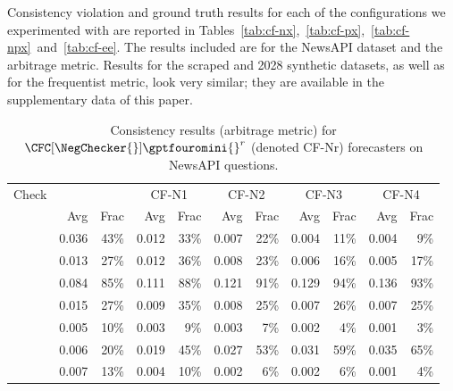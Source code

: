 \label{cfc/app:cf-results}

Consistency violation and ground truth results for each of the \CFCaster{} configurations we experimented with are reported in Tables~\ref{tab:cf-nx},~\ref{tab:cf-px},~\ref{tab:cf-npx}~and~\ref{tab:cf-ee}. The results included are for the NewsAPI dataset and the arbitrage metric.
Results for the scraped and 2028 synthetic datasets, as well as for the
frequentist metric, look very similar; they are available in the supplementary data of this paper.

{
\setlength{\tabcolsep}{0.46em}
\begin{table}[htbp]
\caption{Consistency results (arbitrage metric) for $\CFC[\NegChecker{}]{\gptfouromini{}}^r$ (denoted CF-Nr) forecasters on NewsAPI questions.}
\begin{tabular}{lrrrrrrrrrr}
\toprule
Check & \multicolumn{2}{c}{\gptfouromini{}} & \multicolumn{2}{c}{CF-N1} & \multicolumn{2}{c}{CF-N2} & \multicolumn{2}{c}{CF-N3} & \multicolumn{2}{c}{CF-N4} \\
 & Avg & Frac & Avg & Frac & Avg & Frac & Avg & Frac & Avg & Frac \\
\midrule
\NegChecker{} & 0.036 & 43\% & 0.012 & 33\% & 0.007 & 22\% & 0.004 & 11\% & 0.004 & 9\% \\
\ParaphraseChecker{} & 0.013 & 27\% & 0.012 & 36\% & 0.008 & 23\% & 0.006 & 16\% & 0.005 & 17\% \\
\CondCondChecker{} & 0.084 & 85\% & 0.111 & 88\% & 0.121 & 91\% & 0.129 & 94\% & 0.136 & 93\% \\
\ExpectedEvidenceChecker{} & 0.015 & 27\% & 0.009 & 35\% & 0.008 & 25\% & 0.007 & 26\% & 0.007 & 25\% \\
\ConsequenceChecker{} & 0.005 & 10\% & 0.003 & 9\% & 0.003 & 7\% & 0.002 & 4\% & 0.001 & 3\% \\
\AndChecker{} & 0.006 & 20\% & 0.019 & 45\% & 0.027 & 53\% & 0.031 & 59\% & 0.035 & 65\% \\
\OrChecker{} & 0.007 & 13\% & 0.004 & 10\% & 0.002 & 6\% & 0.002 & 6\% & 0.001 & 4\% \\

\end{tabular}
\end{table}}
